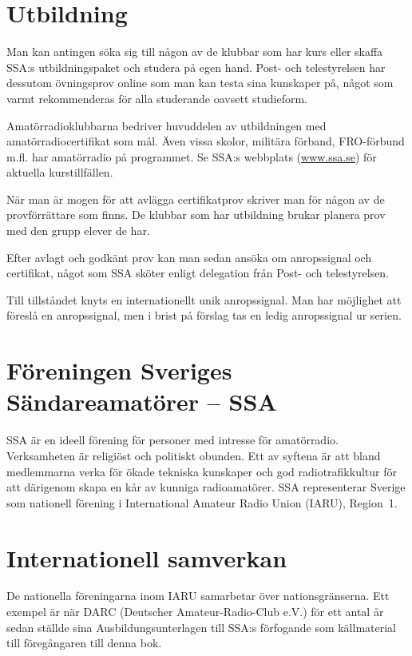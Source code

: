 \section*{Utbildning}

Man kan antingen söka sig till någon av de klubbar som har kurs eller skaffa
SSA:s utbildningspaket och studera på egen hand.
Post- och telestyrelsen har dessutom övningsprov online som man kan testa sina
kunskaper på, något som varmt rekommenderas för alla studerande oavsett
studieform.

Amatörradioklubbarna bedriver huvuddelen av utbildningen med
amatör\-radio\-certi\-fikat som mål.
Även vissa skolor, militära förband, FRO-förbund m.fl. har amatörradio på
programmet.
Se SSA:s webbplats (\href{http://www.ssa.se}{www.ssa.se}) för aktuella kurstillfällen.

När man är mogen för att avlägga certifikatprov skriver man för någon av de
provförrättare som finns. De klubbar som har utbildning brukar planera prov
med den grupp elever de har.

Efter avlagt och godkänt prov kan man sedan ansöka om anropssignal och
certifikat, något som SSA sköter enligt delegation från Post- och telestyrelsen.

Till tillståndet knyts en internationellt unik anropssignal.
Man har möjlighet att föreslå en anropssignal, men i brist på förslag tas en ledig
anropssignal ur serien.

\section*{Föreningen Sveriges Sändareamatörer -- SSA}

SSA är en ideell förening för personer med intresse för amatörradio.
Verksamheten är religiöst och politiskt obunden.
Ett av syftena är att bland medlemmarna verka för ökade tekniska kunskaper och
god radiotrafikkultur för att därigenom skapa en kår av kunniga radioamatörer.
SSA representerar Sverige som nationell förening i
International Amateur Radio Union (IARU), Region~1.

\section*{Internationell samverkan}

De nationella föreningarna inom IARU samarbetar över nationsgränserna.
Ett exempel är när DARC (Deutscher Amateur-Radio-Club e.V.) för ett antal år
sedan ställde sina Ausbildungsunterlagen \cite{DARCaus} till SSA:s förfogande
som källmaterial till föregångaren till denna bok.

